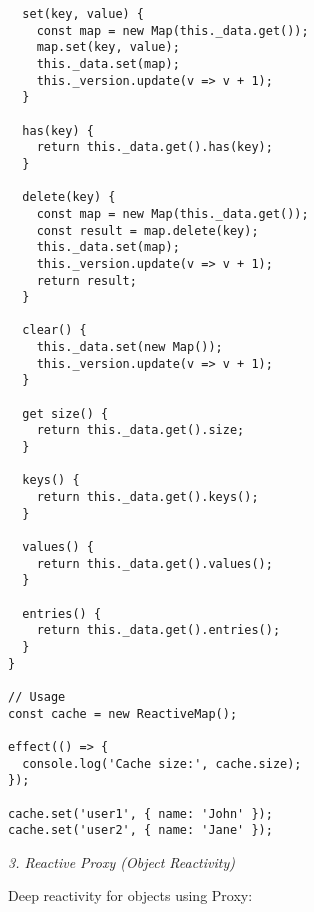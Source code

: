 \documentclass[11pt]{article}
\begin{document}
\begin{verbatim}
  set(key, value) {
    const map = new Map(this._data.get());
    map.set(key, value);
    this._data.set(map);
    this._version.update(v => v + 1);
  }
  
  has(key) {
    return this._data.get().has(key);
  }
  
  delete(key) {
    const map = new Map(this._data.get());
    const result = map.delete(key);
    this._data.set(map);
    this._version.update(v => v + 1);
    return result;
  }
  
  clear() {
    this._data.set(new Map());
    this._version.update(v => v + 1);
  }
  
  get size() {
    return this._data.get().size;
  }
  
  keys() {
    return this._data.get().keys();
  }
  
  values() {
    return this._data.get().values();
  }
  
  entries() {
    return this._data.get().entries();
  }
}

// Usage
const cache = new ReactiveMap();

effect(() => {
  console.log('Cache size:', cache.size);
});

cache.set('user1', { name: 'John' });
cache.set('user2', { name: 'Jane' });
\end{verbatim}

\emph{3. Reactive Proxy (Object Reactivity)}

Deep reactivity for objects using Proxy:
\end{document}
